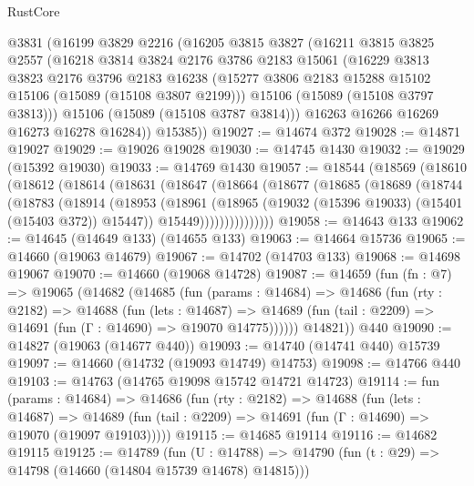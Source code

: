 \begin{lexlean}{RustCore}
\begin{coremodule}
      @3831
      (@16199
        @3829
        @2216
        (@16205
          @3815
          @3827
          (@16211
            @3815
            @3825
            @2557
            (@16218
              @3814
              @3824
              @2176
              @3786
              @2183
              @15061
              (@16229
                @3813
                @3823
                @2176
                @3796
                @2183
                @16238
                (@15277 @3806 @2183 @15288 @15102 @15106 (@15089 (@15108 @3807 @2199)))
                @15106
                (@15089 (@15108 @3797 @3813)))
              @15106
              (@15089 (@15108 @3787 @3814)))
            @16263
            @16266
            @16269
            @16273
            @16278
            @16284))
        @15385))
@19027 := @14674 @372
@19028 := @14871 @19027
@19029 := @19026 @19028
@19030 := @14745 @1430
@19032 := @19029 (@15392 @19030)
@19033 := @14769 @1430
@19057 := @18544
    (@18569
      (@18610
        (@18612
          (@18614
            (@18631
              (@18647
                (@18664
                  (@18677
                    (@18685
                      (@18689
                        (@18744
                          (@18783
                            (@18914
                              (@18953
                                (@18961
                                  (@18965 (@19032 (@15396 @19033) (@15401 (@15403 @372)) @15447))
                                  @15449)))))))))))))))
@19058 := @14643 @133
@19062 := @14645 (@14649 @133) (@14655 @133)
@19063 := @14664 @15736
@19065 := @14660 (@19063 @14679)
@19067 := @14702 (@14703 @133)
@19068 := @14698 @19067
@19070 := @14660 (@19068 @14728)
@19087 := @14659
    (fun (fn : @7) =>
    @19065
      (@14682
        (@14685
          (fun (params : @14684) =>
          @14686
            (fun (rty : @2182) =>
            @14688
              (fun (lets : @14687) =>
              @14689 (fun (tail : @2209) => @14691 (fun (Γ : @14690) => @19070 @14775))))))
        @14821))
    @440
@19090 := @14827 (@19063 (@14677 @440))
@19093 := @14740 (@14741 @440) @15739
@19097 := @14660 (@14732 (@19093 @14749) @14753)
@19098 := @14766 @440
@19103 := @14763 (@14765 @19098 @15742 @14721 @14723)
@19114 := fun (params : @14684) =>
  @14686
    (fun (rty : @2182) =>
    @14688
      (fun (lets : @14687) =>
      @14689 (fun (tail : @2209) => @14691 (fun (Γ : @14690) => @19070 (@19097 @19103)))))
@19115 := @14685 @19114
@19116 := @14682 @19115
@19125 := @14789
    (fun (U : @14788) => @14790 (fun (t : @29) => @14798 (@14660 (@14804 @15739 @14678) @14815)))

\end{coremodule}
\end{lexlean}
